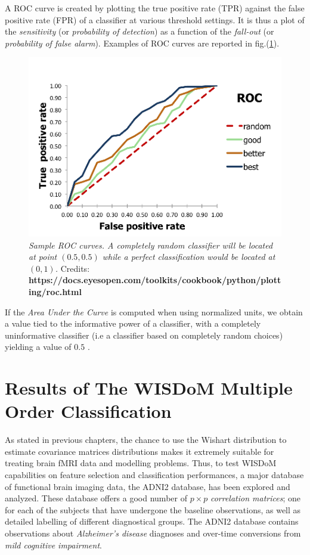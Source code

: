 \documentclass[12pt,openright,twoside,a4paper]{book}
\begin{document}
A ROC  curve is created by plotting the true positive rate (TPR) against the false positive rate (FPR) of a classifier at various threshold settings.
It is thus a plot of the \textit{sensitivity} (or \textit{probability of detection}) as a function of the \textit{fall-out} (or \textit{probability of false alarm}). 
Examples of ROC curves are reported in fig.(\ref{ADNI-roc}).

\begin{figure}[!h]
\centering
\includegraphics[scale=0.65]{roc-theory-small}
\caption{\textit{Sample ROC curves. A completely random classifier will be located at point $(0.5,0.5)$ while a perfect classification would be located at $(0,1)$.}
Credits: \textbf{https://docs.eyesopen.com/toolkits/cookbook/python/plotting/roc.html}}
\label{ADNI-roc}
\end{figure}

If the \textit{Area Under the Curve} is computed when using normalized units, we obtain a value tied to the informative power of a classifier, with a completely uninformative classifier (i.e a classifier based on completely random choices) yielding a value of $0.5$ \cite{ROC}.


\chapter{Results of The WISDoM Multiple Order Classification}

As stated in previous chapters, the chance to use the Wishart distribution to estimate covariance matrices distributions makes it extremely suitable for treating brain fMRI data and modelling problems.
Thus, to test WISDoM capabilities on feature selection and classification performances, a major database of functional brain imaging data, the ADNI2  database, has been explored and analyzed.
These  database offers a good number of $p\times p$ \textit{correlation matrices}; one for each of the subjects that have undergone the baseline observations, as well as detailed labelling of different diagnostical groups.
The ADNI2 database contains observations about \textit{Alzheimer's disease} diagnoses and over-time conversions from \textit{mild cognitive impairment}.
\end{document}
